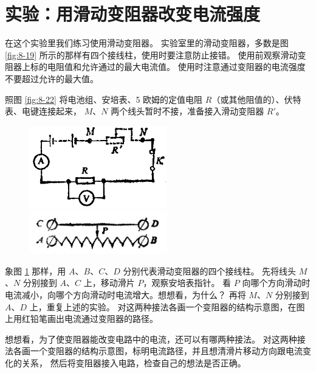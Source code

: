 \section{实验：用滑动变阻器改变电流强度}\label{sec:8-11}

在这个实验里我们练习使用滑动变阻器。
实验室里的滑动变阻器，多数是图 \ref{fig:8-19} 所示的那样有四个接线柱，使用时要注意防止接错。
使用前观察滑动变阻器上标的电阻值和允许通过的最大电流值。
使用时注意通过变阻器的电流强度不要超过允许的最大值。

照图 \ref{fig:8-22} 将电池组、安培表、5 欧姆的定值电阻 $R$（或其他阻值的）、伏特表、电键连接起来，
$M$、$N$ 两个线头暂时不接，准备接入滑动变阻器 $R'$。

\begin{figure}[htbp]
    \centering
    \begin{minipage}{7cm}
    \centering
    \includegraphics[width=6cm]{../pic/czwl2-ch8-22}
    \caption{}\label{fig:8-22}
    \end{minipage}
    \qquad
    \begin{minipage}{7cm}
    \centering
    \includegraphics[width=6cm]{../pic/czwl2-ch8-23}
    \caption{}\label{fig:8-23}
    \end{minipage}
\end{figure}

象图 \ref{fig:8-23} 那样，用 $A$、$B$、$C$、$D$ 分别代表滑动变阻器的四个接线柱。
先将线头 $M$、$N$ 分别接到 $A$、$C$ 上，移动滑片 $P$，观察安培表指针。
看 $P$ 向哪个方向滑动时电流减小，向哪个方向滑动时电流增大。想想看，为什么？
再将 $M$、$N$ 分别接到 $A$、$D$ 上，重复上述的实验。
对这两种接法各画一个变阻器的结构示意图，在图上用红铅笔画出电流通过变阻器的路径。

想想看，为了使变阻器能改变电路中的电流，还可以有哪两种接法。
对这两种接法各画一个变阻器的结构示意图，标明电流路径，并且想清滑片移动方向跟电流变化的关系，
然后将变阻器接入电路，检查自己的想法是否正确。

